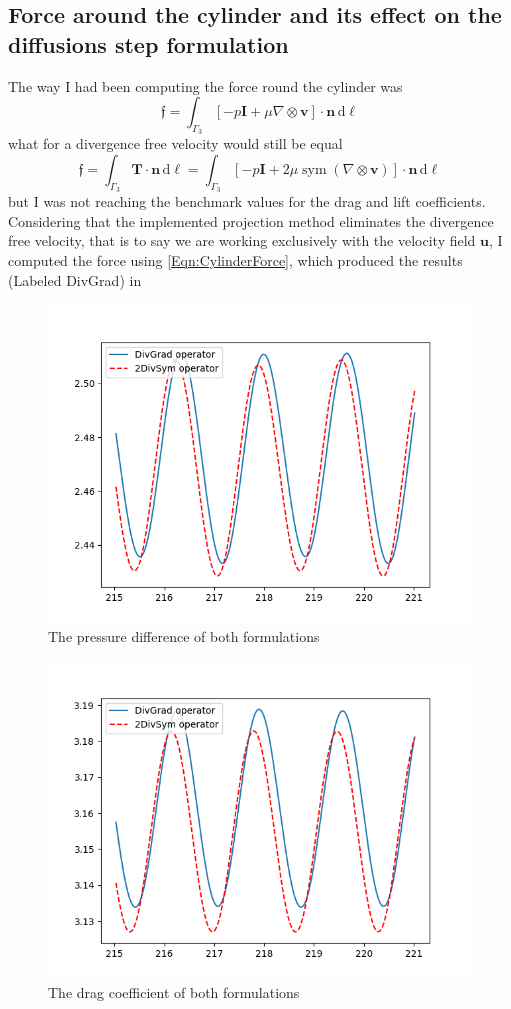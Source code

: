 \documentclass[]{scrartcl}
\renewcommand{\d}{\,\mathrm{d}}
\newcommand{\bs}[1]{\boldsymbol{#1}}
\DeclareMathOperator{\Sym}{sym}
\begin{document}
\subsection{Force around the cylinder and its effect on the diffusions step formulation}
The way I had been computing the force round the cylinder was
\begin{equation*}
	\bs{\mathfrak{f}} =
	\int_{\Gamma_3} [-p\mathbf{I} + \mu \nabla \otimes \mathbf{v}] \cdot \mathbf{n} \d \ell
\end{equation*}
what for a divergence free velocity would still be equal
\begin{equation}\label{Eqn:CylinderForce}
	\bs{\mathfrak{f}} =
	\int_{\Gamma_3} \mathbf{T} \cdot \mathbf{n} \d \ell =
	\int_{\Gamma_3} [-p\mathbf{I} + 2\mu \Sym (\nabla \otimes \mathbf{v})] \cdot \mathbf{n} \d \ell	
\end{equation}
but I was not reaching the benchmark values for the drag and lift coefficients. Considering that the implemented projection method eliminates the divergence free velocity, that is to say we are working exclusively with the velocity field $\mathbf{u}$, I computed the force using \cref{Eqn:CylinderForce}, which produced the results (Labeled DivGrad) in
\begin{figure}
	\centering
	\includegraphics[width=0.5\linewidth]{PressureDifference.png}
	\caption{The pressure difference of both formulations}
	\label{Fig:Pressure}
\end{figure}
\begin{figure}
	\centering
	\includegraphics[width=0.5\linewidth]{DragCoefficient.png}
	\caption{The drag coefficient of both formulations}
	\label{Fig:Drag}
\end{figure}
\end{document}
